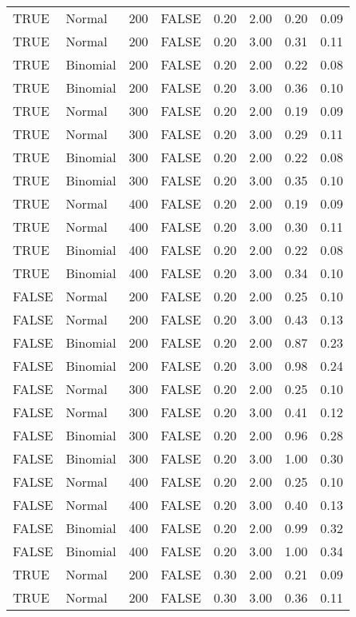 \begin{table}[ht]
\begin{tabular}{llrlrrrr}
  TRUE & Normal & 200 & FALSE & 0.20 & 2.00 & 0.20 & 0.09 \\ 
  TRUE & Normal & 200 & FALSE & 0.20 & 3.00 & 0.31 & 0.11 \\ 
  TRUE & Binomial & 200 & FALSE & 0.20 & 2.00 & 0.22 & 0.08 \\ 
  TRUE & Binomial & 200 & FALSE & 0.20 & 3.00 & 0.36 & 0.10 \\ 
  TRUE & Normal & 300 & FALSE & 0.20 & 2.00 & 0.19 & 0.09 \\ 
  TRUE & Normal & 300 & FALSE & 0.20 & 3.00 & 0.29 & 0.11 \\ 
  TRUE & Binomial & 300 & FALSE & 0.20 & 2.00 & 0.22 & 0.08 \\ 
  TRUE & Binomial & 300 & FALSE & 0.20 & 3.00 & 0.35 & 0.10 \\ 
  TRUE & Normal & 400 & FALSE & 0.20 & 2.00 & 0.19 & 0.09 \\ 
  TRUE & Normal & 400 & FALSE & 0.20 & 3.00 & 0.30 & 0.11 \\ 
  TRUE & Binomial & 400 & FALSE & 0.20 & 2.00 & 0.22 & 0.08 \\ 
  TRUE & Binomial & 400 & FALSE & 0.20 & 3.00 & 0.34 & 0.10 \\ 
  FALSE & Normal & 200 & FALSE & 0.20 & 2.00 & 0.25 & 0.10 \\ 
  FALSE & Normal & 200 & FALSE & 0.20 & 3.00 & 0.43 & 0.13 \\ 
  FALSE & Binomial & 200 & FALSE & 0.20 & 2.00 & 0.87 & 0.23 \\ 
  FALSE & Binomial & 200 & FALSE & 0.20 & 3.00 & 0.98 & 0.24 \\ 
  FALSE & Normal & 300 & FALSE & 0.20 & 2.00 & 0.25 & 0.10 \\ 
  FALSE & Normal & 300 & FALSE & 0.20 & 3.00 & 0.41 & 0.12 \\ 
  FALSE & Binomial & 300 & FALSE & 0.20 & 2.00 & 0.96 & 0.28 \\ 
  FALSE & Binomial & 300 & FALSE & 0.20 & 3.00 & 1.00 & 0.30 \\ 
  FALSE & Normal & 400 & FALSE & 0.20 & 2.00 & 0.25 & 0.10 \\ 
  FALSE & Normal & 400 & FALSE & 0.20 & 3.00 & 0.40 & 0.13 \\ 
  FALSE & Binomial & 400 & FALSE & 0.20 & 2.00 & 0.99 & 0.32 \\ 
  FALSE & Binomial & 400 & FALSE & 0.20 & 3.00 & 1.00 & 0.34 \\ 
  TRUE & Normal & 200 & FALSE & 0.30 & 2.00 & 0.21 & 0.09 \\ 
  TRUE & Normal & 200 & FALSE & 0.30 & 3.00 & 0.36 & 0.11 \\ 

\end{tabular}
\end{table}
